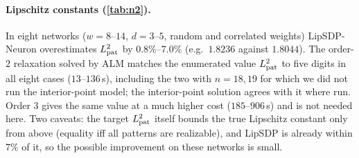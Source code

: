 \documentclass[a4paper,11pt]{article}
\newcommand{\fitbox}[1]{\sbox{\tabbox}{#1}\ifdim\wd\tabbox>\textwidth\resizebox{\textwidth}{!}{\usebox{\tabbox}}\else\usebox{\tabbox}\fi}
\theoremstyle{plain}
\theoremstyle{definition}
\theoremstyle{remark}
\begin{document}
\paragraph{Lipschitz constants (\cref{tab:n2}).} In eight networks ($w=8$--$14$, $d=3$--$5$, random and correlated weights) LipSDP-Neuron overestimates $L_{\rm pat}^2$ by $0.8\%$--$7.0\%$ (e.g.\ $1.8236$ against $1.8044$). The order-$2$ relaxation solved by ALM matches the enumerated value $L_{\rm pat}^2$ to five digits in all eight cases ($13$--$136$\,s), including the two with $n=18,19$ for which we did not run the interior-point model; the interior-point solution agrees with it where run. Order $3$ gives the same value at a much higher cost ($185$--$906$\,s) and is not needed here. Two caveats: the target $L_{\rm pat}^2$ itself bounds the true Lipschitz constant only from above (equality iff all patterns are realizable), and LipSDP is already within $7\%$ of it, so the possible improvement on these networks is small.
\begin{table}[t]\centering\scriptsize
\setlength{\tabcolsep}{3pt}
\fitbox{}
\caption{Squared $\ell_2$ Lipschitz bound of one-hidden-layer ReLU networks: pattern maximum by enumeration, LipSDP-Neuron, and order-$2$/$3$ relaxations (``IPM'': interior point on the mixed Boolean/continuous problem written with equality constraints $t_j^2=1$).}\label{tab:n2}
\end{table}
\end{document}
